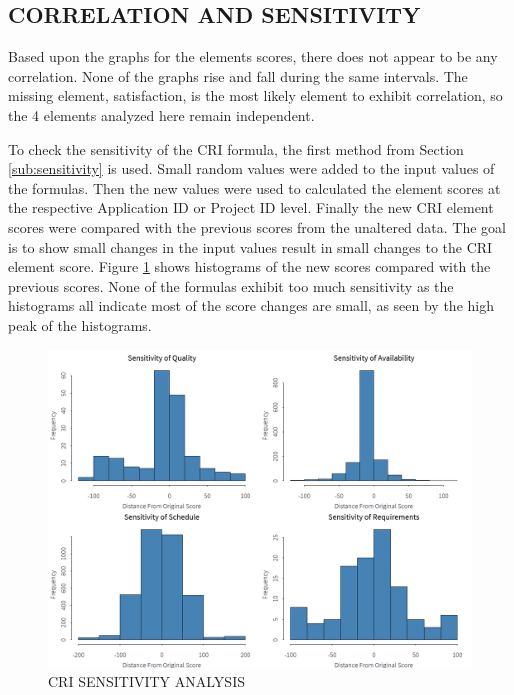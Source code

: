 \documentclass[SDSUThesis.tex]{subfiles}
\begin{document}
    \subsection{CORRELATION AND SENSITIVITY}
        Based upon the graphs for the elements scores, there does not
        appear to be any correlation.  None of the graphs
        rise and fall during the same intervals.  The missing element,
        satisfaction, is the most likely element to exhibit correlation,
        so the 4 elements analyzed here remain independent.
        
        To check the sensitivity of the CRI formula, the first method
        from Section \ref{sub:sensitivity} is used.  Small random
        values were added to the input values of the formulas. 
        Then the new values were used to calculated the element scores 
        at the respective Application ID or Project ID level.  Finally
        the new CRI element scores were compared with the previous
        scores from the unaltered data.  The goal is to show small
        changes in the input values result in small changes to the 
        CRI element score.  Figure \ref{fig:sensitivity} shows
        histograms of the new scores compared with the previous scores.
        None of the formulas exhibit too much sensitivity as the 
        histograms all indicate most of the score changes are small,
        as seen by the high peak of the histograms.  
        
        \begin{figure}[ht]
            \centering
            \includegraphics[scale=.3]{images/sensitivity.png}
            \caption{CRI SENSITIVITY ANALYSIS}
            \label{fig:sensitivity}
        \end{figure}
         
\end{document}
